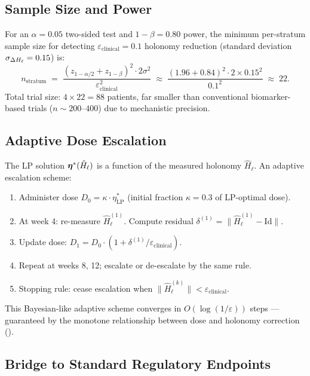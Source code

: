 \subsection{Sample Size and Power}

For an $\alpha = 0.05$ two-sided test and $1 - \beta = 0.80$ power, the minimum
per-stratum sample size for detecting $\varepsilon_{\mathrm{clinical}} = 0.1$
holonomy reduction (standard deviation $\sigma_{\Delta H_\ell} = 0.15$) is:
\begin{equation}
  n_{\mathrm{stratum}}
  \;=\; \frac{(z_{1-\alpha/2} + z_{1-\beta})^2 \cdot 2\sigma^2}
             {\varepsilon_{\mathrm{clinical}}^2}
  \;\approx\; \frac{(1.96 + 0.84)^2 \cdot 2 \times 0.15^2}{0.1^2}
  \;\approx\; 22.
  \label{eq:ch10-power}
\end{equation}
Total trial size: $4 \times 22 = 88$ patients, far smaller than conventional
biomarker-based trials ($n \sim 200$--$400$) due to mechanistic precision.

\subsection{Adaptive Dose Escalation}

The LP solution $\boldsymbol{\eta}^*(\hat{H}_\ell)$ is a function of the measured holonomy
$\hat{H}_\ell$.  An adaptive escalation scheme:

\begin{enumerate}[label=\textbf{Step~\arabic*.}, leftmargin=3em]
  \item Administer dose $D_0 = \kappa \cdot \eta^*_{\mathrm{LP}}$ (initial
    fraction $\kappa = 0.3$ of LP-optimal dose).
  \item At week 4: re-measure $\hat{H}_\ell^{(1)}$.  Compute residual
    $\delta^{(1)} = \|\hat{H}_\ell^{(1)} - \mathrm{Id}\|$.
  \item Update dose: $D_1 = D_0 \cdot (1 + \delta^{(1)} / \varepsilon_{\mathrm{clinical}})$.
  \item Repeat at weeks 8, 12; escalate or de-escalate by the same rule.
  \item Stopping rule: cease escalation when $\|\hat{H}_\ell^{(k)}\| < \varepsilon_{\mathrm{clinical}}$.
\end{enumerate}

This Bayesian-like adaptive scheme converges in $O(\log(1/\varepsilon))$ steps —
guaranteed by the monotone relationship between dose and holonomy correction
().

\subsection{Bridge to Standard Regulatory Endpoints}


